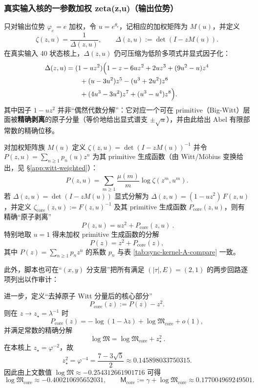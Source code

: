 \subsubsection{真实输入核的一参数加权 zeta(z,u)（输出位势）}\label{app:real-input-40-zeta-u}
只对输出位势 $\varphi_e=e$ 加权，令 $u=e^{\theta_e}$，记相应的加权矩阵为 $M(u)$，并定义
\[
\zeta(z,u)=\frac{1}{\Delta(z,u)},\qquad \Delta(z,u):=\det(I-zM(u)).
\]
在真实输入 40 状态核上，$\Delta(z,u)$ 仍可压缩为低阶多项式并显式因子化：
\[
\begin{aligned}
\Delta(z,u)&=(1-uz^2)\Bigl(
1-z-6uz^2+2uz^3+(9u^2-u)z^4\\
&\qquad +(u-3u^2)z^5-(u^3+2u^2)z^6\\
&\qquad +(4u^3-3u^2)z^7+(u^3-u^4)z^8
\Bigr).
\end{aligned}
\]
其中因子 $1-uz^2$ 并非“偶然代数分解”：它对应一个可在 primitive（Big-Witt）层面被\textbf{精确剥离}的原子分量（等价地给出显式谱支 \(\pm\sqrt u\)），并由此给出 Abel 有限部常数的精确位移。

\begin{proposition}\label{prop:atomic-2-orbit-split-logM}
对加权矩阵族 \(M(u)\) 定义
\(
\zeta(z,u)=\det(I-zM(u))^{-1}
\)
并令 \(P(z,u)=\sum_{n\ge 1}p_n(u)z^n\) 为其 primitive 生成函数（由 Witt/Möbius 变换给出，见 \S\ref{app:witt-weighted}）：
\[
P(z,u)=\sum_{m\ge 1}\frac{\mu(m)}{m}\log\zeta(z^m,u^m).
\]
若 \(\Delta(z,u)=\det(I-zM(u))\) 显式分解为
\(
\Delta(z,u)=(1-uz^2)\,F(z,u)
\)，并定义 \(\zeta_{\mathrm{core}}(z,u):=F(z,u)^{-1}\) 及其 primitive 生成函数 \(P_{\mathrm{core}}(z,u)\)，则有精确“原子剥离”
\[
\boxed{\ P(z,u)=u z^2+P_{\mathrm{core}}(z,u)\ }.
\]
特别地取 \(u=1\) 得未加权 primitive 生成函数的分解
\[
P(z)=z^2+P_{\mathrm{core}}(z),
\]
其中 \(P(z)=\sum_{n\ge 1}p_n z^n\) 的系数 \(p_n\) 与表 \ref{tab:sync-kernel-A-compare} 一致。

此外，脚本也可在“\((x,y)\) 分支层”把所有满足 \((|\tau|,E)=(2,1)\) 的两步回路逐项列出以作审计：



进一步，定义“去掉原子 Witt 分量后的核心部分”
\[
P_{\mathrm{core}}(z):=P(z)-z^2.
\]
则在 $z\to z_\star=\lambda^{-1}$ 时
\[
P_{\mathrm{core}}(z)=-\log(1-\lambda z)+\log\mathfrak{M}_{\mathrm{core}}+o(1),
\]
并满足常数的精确分解
\[
\boxed{\ \log\mathfrak{M}=\log\mathfrak{M}_{\mathrm{core}}+z_\star^2\ }.
\]
在本核上 $z_\star=\varphi^{-2}$，故
\[
z_\star^2=\varphi^{-4}=\frac{7-3\sqrt5}{2}\approx 0.145898033750315.
\]
因此由上文数值 $\log\mathfrak{M}\approx -0.254312661901716$ 可得
\[
\log\mathfrak{M}_{\mathrm{core}}\approx -0.400210695652031,
\qquad
\mathsf{M}_{\mathrm{core}}:=\gamma+\log\mathfrak{M}_{\mathrm{core}}\approx 0.177004969249501.
\]
\end{proposition}

